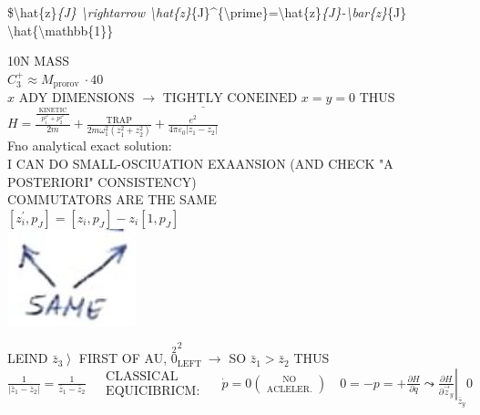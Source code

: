 \documentclass[10pt]{article}
\begin{document}
\$\textbackslash hat\{z\}\textit{\{J\} \textbackslash rightarrow \textbackslash hat\{z\}}\{J\}\^{}\{\textbackslash prime\}=\textbackslash hat\{z\}\textit{\{J\}-\textbackslash bar\{z\}}\{J\} \textbackslash hat\{\textbackslash mathbb\{1\}\}

10N MASS\\
$C_{3}^{+} \approx M_{\text {prorov }} \cdot 40$\\
$\underline{x \text { ADY DIMENSIONS } \rightarrow \text { TIGHTLY CONEINED } x=y=0 \text { THUS }}$\\
$H=\frac{\frac{\text { KINETIC }}{p_{1}^{z^{2}}+p_{2}^{z^{2}}}}{2 m}+\frac{\text { TRAP }}{2 m \omega_{1}^{2}\left(z_{1}^{2}+z_{2}^{2}\right)}+\frac{e^{2}}{4 \pi \varepsilon_{0}\left|z_{1}-z_{2}\right|}$\\
Fno analytical exact solution:\\
I CAN DO SMALL-OSCIUATION EXAANSION (AND CHECK "A POSTERIORI" CONSISTENCY)\\
COMMUTATORS ARE THE SAME\\
$\left[z_{i}^{\prime}, p_{J}\right]=\left[z_{i}, p_{J}\right]-z_{i}\left[1, p_{J}\right]$\\
\includegraphics[max width=\textwidth, center]{2025_10_16_f28de32ab20bd0ac9bbfg-1}

LEIND $\left.\bar{z}_{3}\right\rangle$ FIRST OF AU, $\stackrel{2}{0}_{\text {LEFT }}^{2} \longrightarrow$ SO $\bar{z}_{1}>\bar{z}_{2}$ THUS $\frac{1}{\left|\bar{z}_{1}-\bar{z}_{2}\right|}=\frac{1}{\bar{z}_{1}-\bar{z}_{2}} \begin{aligned} & \text { CLASSICAL } \\ & \text { EQUICIBRICM: }\end{aligned} \quad \dot{p}=0\binom{\text { NO }}{\text { ACLELER. }} \quad 0=-p=+\left.\frac{\partial H}{\partial q} \leadsto \frac{\partial H}{\partial \vec{z}_{y}}\right|_{\bar{z}_{y}} 0$
\end{document}

